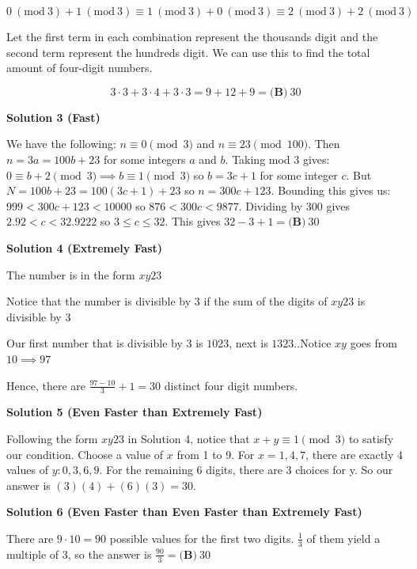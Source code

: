 \begin{enumerate}
 
 \[0\ (\text{mod}\ 3)+1\ (\text{mod}\ 3) \equiv 1\ (\text{mod}\ 3)+0\ (\text{mod}\ 3) \equiv 2\ (\text{mod}\ 3) +2\ (\text{mod}\ 3)\]

 Let the first term in each combination represent the thousands digit and the second term represent the hundreds digit. We can use this to find the total amount of four-digit numbers.

 
 \[3\cdot3 + 3\cdot4 + 3\cdot3 = 9 + 12 + 9 = \boxed{\textbf{(B)}\ 30}\]




\textbf{Solution 3 (Fast)}

We have the following: $n \equiv 0 \pmod{3}$ and $n \equiv 23\pmod{100}$. Then $n = 3a = 100b+23$ for some integers $a$ and $b$.  Taking mod 3 gives:$0 \equiv b+2 \pmod 3 \implies b\equiv 1\pmod 3$ so $b=3c+1$ for some integer $c$.  But $N = 100b+23 = 100(3c+1)+23$ so $n = 300c+123$.  Bounding this gives us:$999 < 300c+123 < 10000$ so $876 < 300c < 9877$.  Dividing by $300$ gives $2.92 < c < 32.9222$ so $3\le c \le 32$.  This gives $32-3+1 = \boxed{\textbf{(B)} \ 30 }$




\textbf{Solution 4 (Extremely Fast)}

The number is in the form $xy23$

 Notice that the number is divisible by $3$ if the sum of the digits of $xy23$ is divisible by $3$

 Our first number that is divisible by $3$ is $1023$, next is $1323$..Notice $xy$ goes from $10\implies 97$

 Hence, there are $\frac{97-10}{3}+1=30$ distinct four digit numbers.

 



\textbf{Solution 5 (Even Faster than Extremely Fast)}

Following the form $xy23$ in Solution 4, notice that $x+y \equiv 1 \pmod 3$ to satisfy our condition. Choose a value of $x$ from 1 to 9. For $x=1, 4, 7$, there are exactly 4 values of $y: 0, 3, 6, 9$. For the remaining 6 digits, there are 3 choices for y. So our answer is $(3)(4)+(6)(3)=30$.

 



\textbf{Solution 6 (Even Faster than Even Faster than Extremely Fast)}

There are $9 \cdot 10 = 90$ possible values for the first two digits. $\frac{1}{3}$ of them yield a multiple of $3$, so the answer is $\frac{90}{3} = \boxed{\textbf{(B)}\ 30}$


\end{enumerate}
